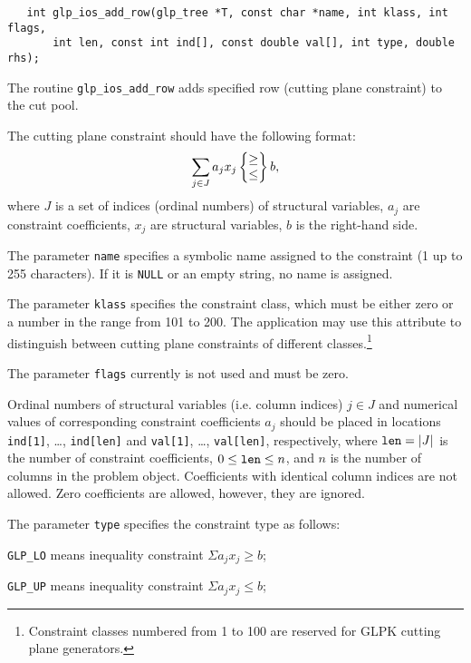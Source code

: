 \synopsis

\begin{verbatim}
   int glp_ios_add_row(glp_tree *T, const char *name, int klass, int flags,
       int len, const int ind[], const double val[], int type, double rhs);
\end{verbatim}

\description

The routine \verb|glp_ios_add_row| adds specified row (cutting plane
constraint) to the cut pool.

The cutting plane constraint should have the following format:
$$\sum_{j\in J}a_jx_j\left\{\begin{array}{@{}c@{}}\geq\\\leq\\
\end{array}\right\}b,$$
where $J$ is a set of indices (ordinal numbers) of structural
variables, $a_j$ are constraint coefficients, $x_j$ are structural
variables, $b$ is the right-hand side.

The parameter \verb|name| specifies a symbolic name assigned to the
constraint (1 up to 255 characters). If it is \verb|NULL| or an empty
string, no name is assigned.

The parameter \verb|klass| specifies the constraint class, which must
be either zero or a number in the range from 101 to 200.
The application may use this attribute to distinguish between cutting
plane constraints of different classes.\footnote{Constraint classes
numbered from 1 to 100 are reserved for GLPK cutting plane generators.}

The parameter \verb|flags| currently is not used and must be zero.

Ordinal numbers of structural variables (i.e. column indices) $j\in J$
and numerical values of corresponding constraint coefficients $a_j$
should be placed in locations \verb|ind[1]|, \dots, \verb|ind[len]| and
\verb|val[1]|, \dots, \verb|val[len]|, respectively, where
${\tt len}=|J|$ is the number of constraint coefficients,
$0\leq{\tt len}\leq n$, and $n$ is the number of columns in the problem
object. Coefficients with identical column indices are not allowed.
Zero coefficients are allowed, however, they are ignored.

The parameter \verb|type| specifies the constraint type as follows:

\verb|GLP_LO| means inequality constraint $\Sigma a_jx_j\geq b$;

\verb|GLP_UP| means inequality constraint $\Sigma a_jx_j\leq b$;

